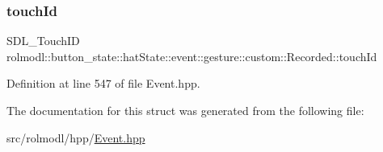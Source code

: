 \subsubsection{\texorpdfstring{touchId}{touchId}}
{\footnotesize\ttfamily S\+D\+L\+\_\+\+Touch\+ID rolmodl\+::button\+\_\+state\+::hat\+State\+::event\+::gesture\+::custom\+::\+Recorded\+::touch\+Id}



Definition at line 547 of file Event.\+hpp.



The documentation for this struct was generated from the following file\+:\begin{DoxyCompactItemize}
\item 
src/rolmodl/hpp/\mbox{\hyperlink{_event_8hpp}{Event.\+hpp}}\end{DoxyCompactItemize}
